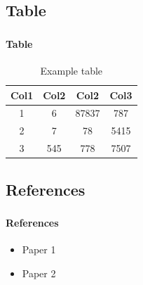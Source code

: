 \def\slidetitle{Table}

\subsection{\slidetitle}
\begin{frame}
  \frametitle{\sectiontitle}
  \framesubtitle{\slidetitle}

  \begin{center}
    \begin{table}
      \begin{tabular}{|c|c|c|c|}
       \hline
       \rowcolor{tableFirstRowColor} Col1 & Col2 & Col2 & Col3 \\ [0.5ex]
       \hline
       \cellcolor{tableFirstColColor} 1 & 6 & 87837 & 787 \\
       \hline
       \cellcolor{tableFirstColColor} 2 & 7 & 78 & 5415 \\
       \hline
       \cellcolor{tableFirstColColor} 3 & 545 & 778 & 7507 \\
       \hline
      \end{tabular}
      \caption{Example table}
    \end{table}
  \end{center}
\end{frame}

\def\slidetitle{References}

\subsection{\slidetitle}
\begin{frame}
  \frametitle{\sectiontitle}
  \framesubtitle{\slidetitle}

  \begin{itemize}
    \item Paper 1 \cite{blattner2017model}
    \item Paper 2 \cite{bardakoff2020hedgehog}
  \end{itemize}
\end{frame}

